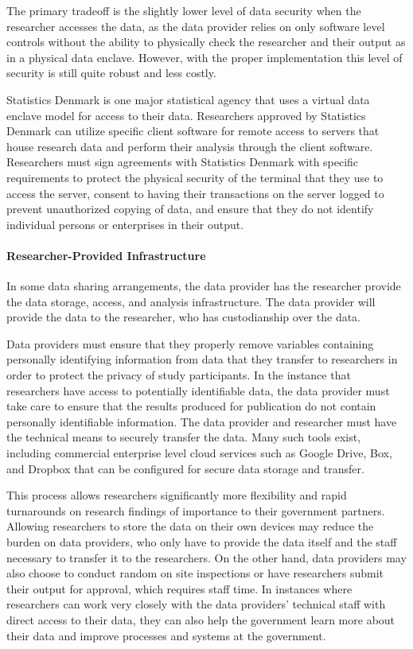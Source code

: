 The primary tradeoff is the slightly lower level of data security when
the researcher accesses the data, as the data provider relies on only
software level controls without the ability to physically check the
researcher and their output as in a physical data enclave. However, with
the proper implementation this level of security is still quite robust
and less costly.

Statistics Denmark is one major statistical agency that uses a virtual
data enclave model for access to their data. Researchers approved by
Statistics Denmark can utilize specific client software for remote
access to servers that house research data and perform their analysis
through the client software. Researchers must sign agreements with
Statistics Denmark with specific requirements to protect the physical
security of the terminal that they use to access the server, consent to
having their transactions on the server logged to prevent unauthorized
copying of data, and ensure that they do not identify individual persons
or enterprises in their output.

\hypertarget{researcher-provided-infrastructure}{%
\paragraph{Researcher-Provided
Infrastructure}\label{researcher-provided-infrastructure}}

In some data sharing arrangements, the data provider has the researcher
provide the data storage, access, and analysis infrastructure. The data
provider will provide the data to the researcher, who has custodianship
over the data.

Data providers must ensure that they properly remove variables
containing personally identifying information from data that they
transfer to researchers in order to protect the privacy of study
participants. In the instance that researchers have access to
potentially identifiable data, the data provider must take care to
ensure that the results produced for publication do not contain
personally identifiable information. The data provider and researcher
must have the technical means to securely transfer the data. Many such
tools exist, including commercial enterprise level cloud services such
as Google Drive, Box, and Dropbox that can be configured for secure data
storage and transfer.

This process allows researchers significantly more flexibility and rapid
turnarounds on research findings of importance to their government
partners. Allowing researchers to store the data on their own devices
may reduce the burden on data providers, who only have to provide the
data itself and the staff necessary to transfer it to the researchers.
On the other hand, data providers may also choose to conduct random on
site inspections or have researchers submit their output for approval,
which requires staff time. In instances where researchers can work very
closely with the data providers' technical staff with direct access to
their data, they can also help the government learn more about their
data and improve processes and systems at the government.

